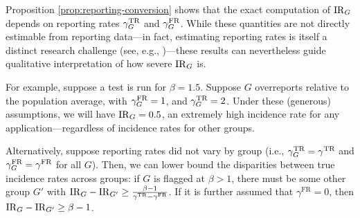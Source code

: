 Proposition \ref{prop:reporting-conversion} shows that the exact computation of ${\mathrm{IR}_G}$ depends on reporting rates ${\gamma_G^{\text{TR}}}$ and ${\gamma_G^{\text{FR}}}$. While these quantities are not directly estimable from reporting data---in fact, estimating reporting rates is itself a distinct research challenge (see, e.g., \citet{liu2024quantifying})---these results can nevertheless guide qualitative interpretation of how severe ${\mathrm{IR}_G}$ is. 

For example, suppose a test is run for $\beta = 1.5$. 
Suppose $G$ overreports relative to the population average, with ${\gamma_G^{\text{FR}}} = 1$, and ${\gamma_G^{\text{TR}}} = 2$. 
\iftoggle{icml}{}{That is, $G$ \textit{falsely reports} at the same rate as the population reports on average (which includes both true and false reports), and submits true reports at twice the population average rate.} Under these (generous) assumptions, we will have ${\mathrm{IR}_G} = 0.5$, an extremely high incidence rate for any application---regardless of incidence rates for other groups. 

Alternatively, suppose reporting rates did not vary by group (i.e., ${\gamma_G^{\text{TR}}} = \gamma^{\text{TR}}$ and ${\gamma_G^{\text{FR}}} = \gamma^{\text{FR}}$ for all $G$). Then, we can lower bound the disparities between true incidence rates across groups: 
if $G$ is flagged at $\beta > 1$, there must be some other group $G'$ with ${\mathrm{IR}_G} - \mathrm{IR}_{G'} \geq \frac{\beta - 1}{\gamma^{\text{TR}}-\gamma^{\text{FR}}}$. If it is further assumed that $\gamma^{\text{FR}}=0$, then ${\mathrm{IR}_G} - \mathrm{IR}_{G'} \geq \beta - 1$.
